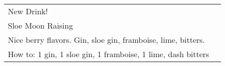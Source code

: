 \documentclass[12pt]{article}
\makeatletter
\newcommand*\ColText[1]{\textcolor{DarkColor}{#1}}
\newenvironment{Group}[1]
  {\noindent\begin{tabular*}{\textwidth}{@{}p{.8\linewidth}@{\extracolsep{\fill}}r@{}}
    {\fontsize{24}{29}\selectfont\ColText{#1}}\\[0.8em]}
  {\end{tabular*}}
\newcommand*\Entry[1]{%
  \sffamily#1 \\
}
\newcommand*\Expl[1]{
  \hspace*{1em}\footnotesize #1 \\
}
\newcommand*\HowTo[1]{
  \hspace*{1em}\footnotesize How to: \hspace*{1em}#1 \\
}
\makeatother
\begin{document}
\begin{Group}{New Drink!}
\Entry{Sloe Moon Raising}
\Expl{Nice berry flavors. Gin, sloe gin, framboise, lime, bitters.}
\HowTo{1 gin, 1 sloe gin, 1 framboise, 1 lime, dash bitters}
\end{Group}
\vfill

%

%



%


\end{document}
